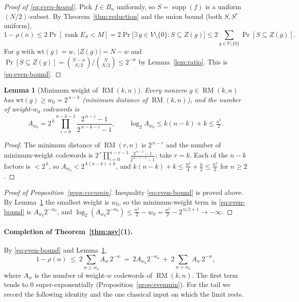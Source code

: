 \documentclass{amsart}
\newtheorem{lemma}[theorem]{Lemma}
\theoremstyle{definition}
\DeclareMathOperator{\supp}{supp}
\DeclareMathOperator{\RM}{RM}
\DeclareMathOperator{\rank}{rank}
\begin{document}
\begin{proof}[Proof of \eqref{eq:even-bound}]
Pick $f\in B_n$ uniformly, so $S=\supp(f)$ is a uniform $(N/2)$-subset.
By Theorem~\ref{thm:reduction} and the union bound (both $S,S^c$ uniform),
\[
1-\rho(n)\le 2\Pr[\rank E_S<M]
=2\Pr\bigl[\exists\,g\in V\setminus\{0\}:S\subseteq Z(g)\bigr]
\le 2\!\!\sum_{g\in V\setminus\{0\}}\!\!\Pr[S\subseteq Z(g)].
\]
For $g$ with $\mathrm{wt}(g)=w$, $|Z(g)|=N-w$ and
$\Pr[S\subseteq Z(g)]=\binom{N-w}{N/2}/\binom{N}{N/2}\le2^{-w}$ by
Lemma~\ref{lem:ratio}. This is \eqref{eq:even-bound}.
\end{proof}

\begin{lemma}[Minimum weight of $\RM(k,n)$]\label{lem:minw}
Every nonzero $g\in\RM(k,n)$ has $\mathrm{wt}(g)\ge w_0=2^{\,n-k}$
(minimum distance of $\RM(k,n)$), and the number of weight-$w_0$ codewords
is
\[
A_{w_0}=2^{\,k}\prod_{i=0}^{n-k-1}\frac{2^{\,n-i}-1}{2^{\,n-k-i}-1},
\qquad \log_2 A_{w_0}\le k(n-k)+k\le\tfrac{n^2}{2}.
\]
\end{lemma}
\begin{proof}
The minimum distance of $\RM(r,n)$ is $2^{\,n-r}$ and the number of
minimum-weight codewords is
$2^{\,r}\prod_{i=0}^{n-r-1}\frac{2^{\,n-i}-1}{2^{\,n-r-i}-1}$; take $r=k$.
Each of the $n-k$ factors is $<2^{\,k}$, so $A_{w_0}<2^{\,k(n-k)+k}$, and
$k(n-k)+k\le\frac{n^2}{4}+\frac n2\le\frac{n^2}{2}$ for $n\ge2$.
\end{proof}

\begin{proof}[Proof of Proposition~\ref{prop:evenmin}]
Inequality \eqref{eq:even-bound} is proved above. By Lemma~\ref{lem:minw}
the smallest weight is $w_0$, so the minimum-weight term in
\eqref{eq:even-bound} is $A_{w_0}2^{-w_0}$, and
$\log_2(A_{w_0}2^{-w_0})\le\frac{n^2}{2}-w_0=\frac{n^2}{2}-2^{\,n/2+1}\to
-\infty$.
\end{proof}

\paragraph{Completion of Theorem~\ref{thm:asy}(1).}
By \eqref{eq:even-bound} and Lemma~\ref{lem:minw},
\begin{equation}\label{eq:tailsplit}
1-\rho(n)\ \le\ 2\sum_{w\ge w_0}A_w\,2^{-w}
\ =\ 2A_{w_0}2^{-w_0}\ +\ 2\sum_{w>w_0}A_w\,2^{-w},
\end{equation}
where $A_w$ is the number of weight-$w$ codewords of $\RM(k,n)$. The first
term tends to $0$ super-exponentially (Proposition~\ref{prop:evenmin}). For
the tail we record the following identity and the one classical input on
which the limit rests.
\end{document}
